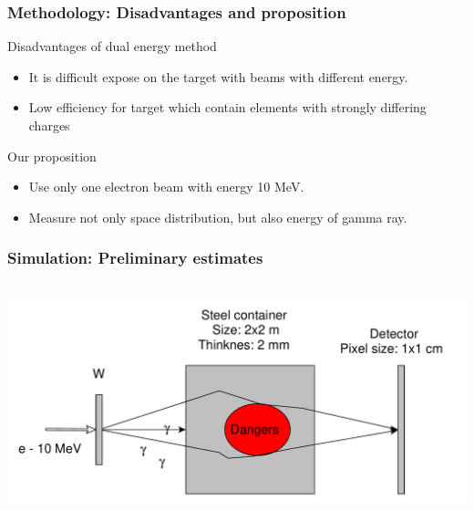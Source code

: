 \documentclass[11pt]{beamer}
\begin{document}
\begin{frame}
    \frametitle{Methodology: Disadvantages and proposition}
    \begin{block}{Disadvantages of dual energy method}%
        \begin{itemize}
            \item It is difficult expose on the target with beams with different energy.
            \item Low efficiency for target which contain elements with strongly differing charges
        \end{itemize}
    \end{block}
    \begin{block}{Our proposition}%
        \begin{itemize}
            \item Use only one electron beam with energy 10 MeV.
            \item Measure not only space distribution, but also energy of gamma ray.
        \end{itemize}
    \end{block}
\end{frame}
    \begin{frame}
    \frametitle{Simulation: Preliminary estimates}
    \begin{columns}
%                
        \begin{column}{1\textwidth} 
            \includegraphics[width=1\textwidth]{figures/yed_schema_1.pdf}
        \end{column}
    \end{columns}  
\end{frame}
\end{document}
